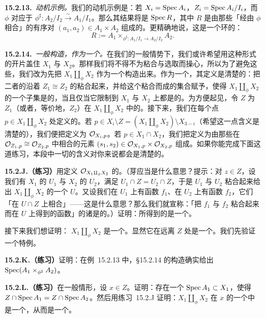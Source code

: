 \textbf{15.2.13.}\ \emph{动机示例。}\quad 我们的动机示例是：若 $X_i=\operatorname{Spec} A_i$，$Z_i=\operatorname{Spec} A_i/I_i$，而 $\phi$ 对应于 $\phi^{\sharp}\colon A_2/I_2\overset{\sim}{\longrightarrow}A_1/I_1$。那么其结果将是 $\operatorname{Spec} R$，其中 $R$ 是由那些「经由 $\phi$ 相合」的有序对 $(a_1,a_2)\in A_1\times A_2$ 组成的\trRing。更精确地说，这是一个环的\trFiberProduct：
\[
R:=A_1\times_{\phi^{\sharp}\colon A_1/I_1\to A_2/I_2}A_2.
\]

\textbf{15.2.14.}\ \emph{一般构造，作为一个\trLocallyRingedSpace。}\quad 在我们的一般情势下，我们或许希望用这种形式的开片盖住 $X_1$ 与 $X_2$。那样我们将不得不为粘合与选取而操心，所以为了避免这些，我们改为先把 $X_1\amalg_\phi X_2$ 作为一个\trLocallyRingedSpace{}构造出来。作为一个\trTopologicalSpace，其定义是清楚的：把二者的\trUnderlyingSet{}沿着 $Z_1\cong Z_2$ 的\trUnderlyingSet{}粘合起来，并给这个粘合而成的集合赋予\trTopology，使得 $X_1\amalg_\phi X_2$ 的一个子集是\trOpen{}的，当且仅当它限制到 $X_1$ 与 $X_2$ 上都是\trOpen{}的。为方便起见，令 $Z$ 为 $Z_1$（或者，等价地，$Z_2$）在 $X_1\amalg_\phi X_2$ 中的\trImage。接下来，我们在每个点 $p\in X_1\amalg_\phi X_2$ 处定义\trStructureSheaf{}的\trStalk。若 $p\in X_i\setminus Z=(X_1\amalg_\phi X_2)\setminus X_{3-i}$（希望这一点含义是清楚的），我们便把\trStalk{}定义为 $\mathcal{O}_{X_i,p}$。若 $p\in X_1\cap X_2$，我们把\trStalk{}定义为由那些在 $\mathcal{O}_{Z_1,p}\cong\mathcal{O}_{Z_2,p}$ 中相合的元素 $(s_1,s_2)\in\mathcal{O}_{X_1,p}\times\mathcal{O}_{X_2,p}$ 组成。如果你能完成下面这道练习，本段中一切的含义对你来说都会是清楚的。

\textbf{15.2.J.（练习）}\quad 用\trCompatibleGerm{}定义 $\mathcal{O}_{X_1\amalg_\phi X_2}$ 的\trStructureSheaf。（芽\trCompatible{}应当是什么意思？提示：对 $z\in Z$，设我们有 $X_1$ 的\trOpenSubset{} $U_1$ 与 $X_2$ 的\trOpenSubset{} $U_2$，满足 $U_1\cap Z=U_2\cap Z$，于是 $U_1$ 与 $U_2$ 粘合起来给出 $X_1\amalg_\phi X_2$ 的一个\trOpenSubset{} $U$。又设我们在 $U_1$ 上有函数 $f_1$、在 $U_2$ 上有函数 $f_2$，它们「在 $U\cap Z$ 上相合」——这是什么意思？那么我们就宣称：「把 $f_1$ 与 $f_2$ 粘合起来而在 $U$ 上得到的函数」的诸\trGerm{}是\trCompatible{}的。）证明：所得到的\trRingedSpace{}是一个\trLocallyRingedSpace。

接下来我们想证明：\trLocallyRingedSpace{} $X_1\amalg_\phi X_2$ 是一个\trScheme。显然它在远离 $Z$ 处是一个\trScheme。我们先验证一个特例。

\textbf{15.2.K.（练习）}\quad 证明：在\mbox{例~15.2.13} 中，\S15.2.14 的构造确实给出 $\operatorname{Spec}(A_1\times_{\phi^{\sharp}}A_2)$。

\textbf{15.2.L.（练习）}\quad 在一般情形，设 $x\in Z$。证明：存在一个\trAffine\trOpenSubset{} $\operatorname{Spec} A_1\subset X_1$，使得 $Z\cap\operatorname{Spec} A_1=Z\cap\operatorname{Spec} A_2$。然后用\mbox{练习~15.2.J} 证明：$X_1\amalg_\phi X_2$ 在 $x$ 的一个\trOpen\trNeighborhood{}中是一个\trScheme，从而是一个\trScheme。

